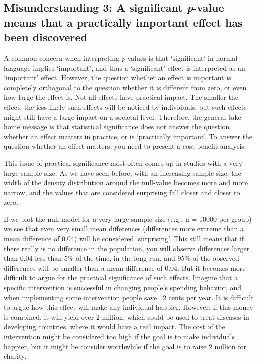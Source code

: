 \documentclass[
]{krantz}
\begin{document}
\hypertarget{misunderstanding-3-a-significant-p-value-means-that-a-practically-important-effect-has-been-discovered}{%
\subsection{\texorpdfstring{Misunderstanding 3: A significant \emph{p}-value means that a practically important effect has been discovered}{Misunderstanding 3: A significant p-value means that a practically important effect has been discovered}}\label{misunderstanding-3-a-significant-p-value-means-that-a-practically-important-effect-has-been-discovered}}

A common concern when interpreting \emph{p}-values is that `significant' in normal language implies `important', and thus a `significant' effect is interpreted as an `important' effect. However, the question whether an effect is important is completely orthogonal to the question whether it is different from zero, or even how large the effect is. Not all effects have practical impact. The smaller the effect, the less likely such effects will be noticed by individuals, but such effects might still have a large impact on a societal level. Therefore, the general take home message is that statistical significance does not answer the question whether an effect matters in practice, or is `practically important'. To answer the question whether an effect matters, you need to present a cost-benefit analysis.

This issue of practical significance most often comes up in studies with a very large sample size. As we have seen before, with an increasing sample size, the width of the density distribution around the null-value becomes more and more narrow, and the values that are considered surprising fall closer and closer to zero.

If we plot the null model for a very large sample size (e.g., n = 10000 per group) we see that even very small mean differences (differences more extreme than a mean difference of 0.04) will be considered `surprising'. This still means that if there really is no difference in the population, you will observe differences larger than 0.04 less than 5\% of the time, in the long run, and 95\% of the observed differences will be smaller than a mean difference of 0.04. But it becomes more difficult to argue for the practical significance of such effects. Imagine that a specific intervention is successful in changing people's spending behavior, and when implementing some intervention people save 12 cents per year. It is difficult to argue how this effect will make any individual happier. However, if this money is combined, it will yield over 2 million, which could be used to treat diseases in developing countries, where it would have a real impact. The cost of the intervention might be considered too high if the goal is to make individuals happier, but it might be consider worthwhile if the goal is to raise 2 million for charity.
\end{document}
